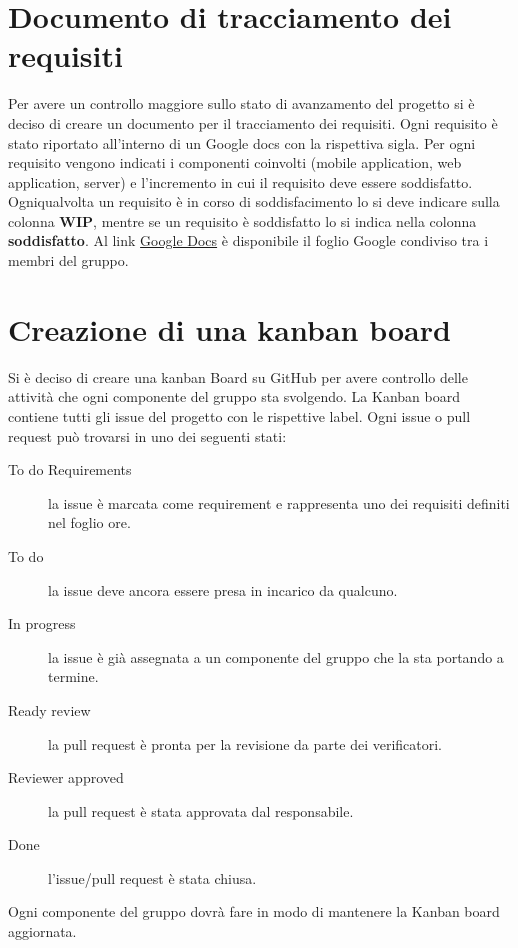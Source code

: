 \documentclass{article}
\begin{document}
\section{Documento di tracciamento dei requisiti}%
\label{sec:documento_di_tracciamento_dei_requisiti}

Per avere un controllo maggiore sullo stato di avanzamento del progetto si è deciso di creare un documento per il tracciamento dei requisiti.
Ogni requisito è stato riportato all'interno di un Google docs  con la rispettiva sigla.
Per ogni requisito vengono indicati i componenti coinvolti (mobile application, web application, server) e l'incremento in cui il requisito deve essere soddisfatto.
Ogniqualvolta un requisito è in corso di soddisfacimento lo si deve indicare sulla colonna \textbf{WIP}, mentre se un requisito è soddisfatto lo si indica nella colonna \textbf{soddisfatto}.
Al link \href{https://docs.google.com/spreadsheets/d/1J-RbNrb1yN_X1rVlKzpP9rjaiGst8B62k1K6EHY-grU/edit#gid=0}{Google Docs} è disponibile il foglio Google condiviso tra i membri del gruppo.

\section{Creazione di una kanban board}%
\label{sec:creazione_di_una_kanban_board}

Si è deciso di creare una kanban Board su GitHub per avere controllo delle attività che ogni componente del gruppo sta svolgendo.
La Kanban board contiene tutti gli issue del progetto con le rispettive label. Ogni issue o pull request può trovarsi in uno dei seguenti stati:
\begin{description}
  \item [To do Requirements] la issue è marcata come requirement e rappresenta uno dei requisiti definiti nel foglio ore.
  \item [To do] la issue deve ancora essere presa in incarico da qualcuno.
  \item [In progress] la issue è già assegnata a un componente del gruppo che la sta portando a termine.
  \item [Ready review] la pull request è pronta per la revisione da parte dei verificatori.
  \item [Reviewer approved] la pull request è stata approvata dal responsabile.
  \item [Done] l'issue/pull request è stata chiusa.
\end{description}
Ogni componente del gruppo dovrà fare in modo di mantenere la Kanban board aggiornata.
\end{document}
